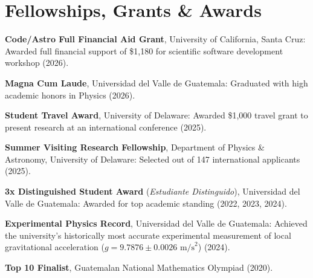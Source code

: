 \section{Fellowships, Grants \& Awards}

\begin{onecolentry}
\begin{highlights}
    \item \textbf{Code/Astro Full Financial Aid Grant}, University of California, Santa Cruz: Awarded full financial support of \$1,180 for scientific software development workshop (2026).
    \item \textbf{Magna Cum Laude}, Universidad del Valle de Guatemala: Graduated with high academic honors in Physics (2026).
    \item \textbf{Student Travel Award}, University of Delaware: Awarded \$1,000 travel grant to present research at an international conference (2025).
    \item \textbf{Summer Visiting Research Fellowship}, Department of Physics \& Astronomy, University of Delaware: Selected out of 147 international applicants (2025).
    \item \textbf{3x Distinguished Student Award} (\textit{Estudiante Distinguido}), Universidad del Valle de Guatemala: Awarded for top academic standing (2022, 2023, 2024).
    \item \textbf{Experimental Physics Record}, Universidad del Valle de Guatemala: Achieved the university's historically most accurate experimental measurement of local gravitational acceleration ($g = 9.7876 \pm 0.0026\text{ m/s}^2$) (2024).
    \item \textbf{Top 10 Finalist}, Guatemalan National Mathematics Olympiad (2020).
\end{highlights}
\end{onecolentry}
